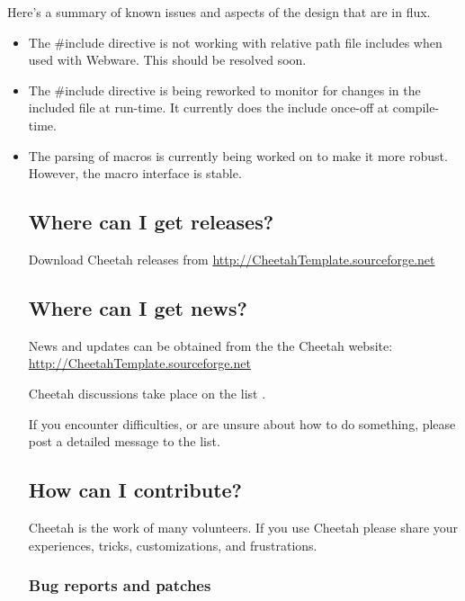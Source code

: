 Here's a summary of known issues and aspects of the design that are in flux.
\begin{itemize}
\item The \#include directive is not working with relative path file includes
     when used with Webware. This should be resolved soon.
\item The \#include directive is being reworked to monitor for changes in the
     included file at run-time. It currently does the include once-off at
     compile-time.
\item The parsing of macros is currently being worked on to make it more
     robust.  However, the macro interface is stable.



\subsection{Where can I get releases?}
\label{intro.releases}

Download Cheetah releases from
\url{http://CheetahTemplate.sourceforge.net}

\subsection{Where can I get news?}
\label{intro.news}

News and updates can be obtained from the the Cheetah website:
\url{http://CheetahTemplate.sourceforge.net}

Cheetah discussions take place on the list
.

If you encounter difficulties, or are unsure about how to do something,
please post a detailed message to the list.

\subsection{How can I contribute?}
\label{intro.contribute}

Cheetah is the work of many volunteers.  If you use Cheetah please share your
experiences, tricks, customizations, and frustrations.

\subsubsection{Bug reports and patches}


\end{itemize}
